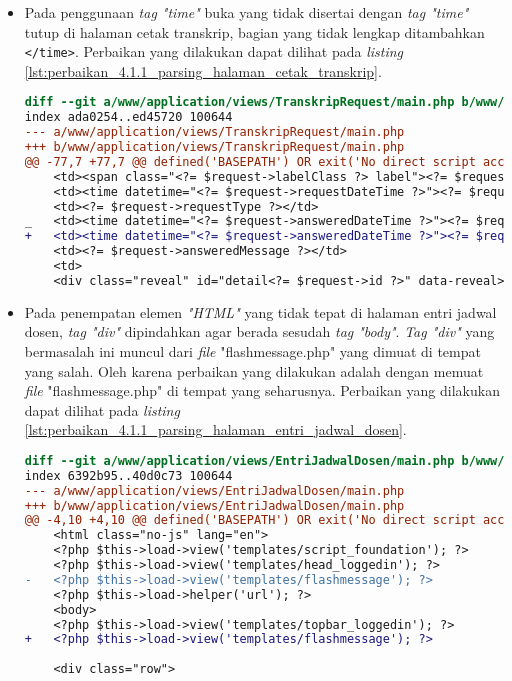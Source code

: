 \begin{itemize}
\item Pada penggunaan \textit{tag "time"} buka yang tidak disertai dengan \textit{tag "time"} tutup di halaman cetak transkrip, bagian yang tidak lengkap ditambahkan \texttt{</time>}. Perbaikan yang dilakukan dapat dilihat pada \textit{listing} \ref{lst:perbaikan_4.1.1_parsing_halaman_cetak_transkrip}.
\begin{lstlisting}[frame=single, label={lst:perbaikan_4.1.1_parsing_halaman_cetak_transkrip}, language=diff, caption=Perbaikan Kriteria Sukses 4.1.1 pada Halaman Cetak Transkrip]
diff --git a/www/application/views/TranskripRequest/main.php b/www/application/views/TranskripRequest/main.php
index ada0254..ed45720 100644
--- a/www/application/views/TranskripRequest/main.php
+++ b/www/application/views/TranskripRequest/main.php
@@ -77,7 +77,7 @@ defined('BASEPATH') OR exit('No direct script access allowed');
    <td><span class="<?= $request->labelClass ?> label"><?= $request->status ?></span></td>
    <td><time datetime="<?= $request->requestDateTime ?>"><?= $request->requestDateString ?></time></td>
    <td><?= $request->requestType ?></td>
_   <td><time datetime="<?= $request->answeredDateTime ?>"><?= $request->answeredDateString ?></td>
+   <td><time datetime="<?= $request->answeredDateTime ?>"><?= $request->answeredDateString ?></time></td>
    <td><?= $request->answeredMessage ?></td>
    <td>
    <div class="reveal" id="detail<?= $request->id ?>" data-reveal>
\end{lstlisting} 

\item Pada penempatan elemen \textit{"HTML"} yang tidak tepat di halaman entri jadwal dosen, \textit{tag "div"} dipindahkan agar berada sesudah \textit{tag "body"}. \textit{Tag "div"} yang bermasalah ini muncul dari \textit{file} "flashmessage.php" yang dimuat di tempat yang salah. Oleh karena perbaikan yang dilakukan adalah dengan memuat \textit{file} "flashmessage.php" di tempat yang seharusnya. Perbaikan yang dilakukan dapat dilihat pada \textit{listing} \ref{lst:perbaikan_4.1.1_parsing_halaman_entri_jadwal_dosen}.
\begin{lstlisting}[frame=single, label={lst:perbaikan_4.1.1_parsing_halaman_entri_jadwal_dosen}, language=diff, caption=Perbaikan Kriteria Sukses 4.1.1 pada Halaman Entri Jadwal Dosen]
diff --git a/www/application/views/EntriJadwalDosen/main.php b/www/application/views/EntriJadwalDosen/main.php
index 6392b95..40d0c73 100644
--- a/www/application/views/EntriJadwalDosen/main.php
+++ b/www/application/views/EntriJadwalDosen/main.php
@@ -4,10 +4,10 @@ defined('BASEPATH') OR exit('No direct script access allowed');
    <html class="no-js" lang="en">
    <?php $this->load->view('templates/script_foundation'); ?>
    <?php $this->load->view('templates/head_loggedin'); ?>
-	<?php $this->load->view('templates/flashmessage'); ?>
    <?php $this->load->helper('url'); ?>
    <body>
    <?php $this->load->view('templates/topbar_loggedin'); ?>
+   <?php $this->load->view('templates/flashmessage'); ?>
 
    <div class="row">
\end{lstlisting} 
\end{itemize}

